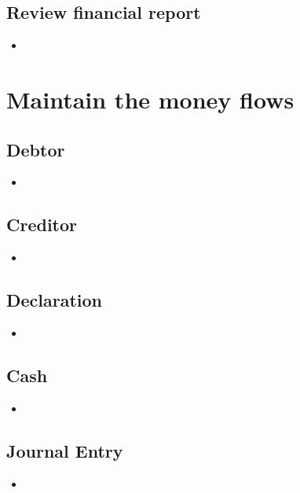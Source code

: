 \documentclass{report}
\begin{document}
\subsection{Review financial report}
\begin{itemize} 
\vspace{-1mm}
\itemsep-1mm 
\item 
\end{itemize}

\section{Maintain the money flows}

\subsection{Debtor}
\begin{itemize} 
\vspace{-1mm}
\itemsep-1mm 
\item 
\end{itemize}

\subsection{Creditor}
\begin{itemize} 
\vspace{-1mm}
\itemsep-1mm 
\item 
\end{itemize}

\subsection{Declaration}
\begin{itemize} 
\vspace{-1mm}
\itemsep-1mm 
\item 
\end{itemize}

\subsection{Cash}
\begin{itemize} 
\vspace{-1mm}
\itemsep-1mm 
\item 
\end{itemize}

\subsection{Journal Entry}
\begin{itemize} 
\vspace{-1mm}
\itemsep-1mm 
\item 
\end{itemize}
\end{document}
